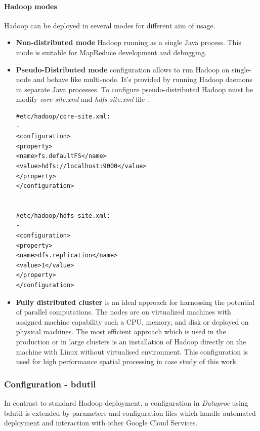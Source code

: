 \documentclass[a4paper,12pt,oneside]{report}
\begin{document}
	
	\paragraph{Hadoop modes} Hadoop can be deployed in several modes for different aim of usage. 
		\begin{itemize}
	    \item \textbf{Non-distributed mode} Hadoop running  as a single Java process. This mode  is suitable for MapReduce development and debugging.
	 	
		\item \textbf{Pseudo-Distributed mode}  configuration allows to run  Hadoop on
		single-node and behave
		like multi-node. It's provided by running Hadoop daemons in separate Java
		processes. To configure pseudo-distributed Hadoop must be modify
		\textit{core-site.xml} and \textit{hdfs-site.xml} file \cite{hadoop_definitive}.  
		
		
		\begin{footnotesize}
			\begin{lstlisting}[style=python]
#etc/hadoop/core-site.xml:
-
<configuration>
<property>
<name>fs.defaultFS</name>
<value>hdfs://localhost:9000</value>
</property>
</configuration>


#etc/hadoop/hdfs-site.xml: 
-
<configuration>
<property>
<name>dfs.replication</name>
<value>1</value>
</property>
</configuration>
			\end{lstlisting}
		\end{footnotesize}
		
		\item \textbf{Fully distributed cluster} is an ideal approach for harnessing the
		potential of	parallel computations. The nodes are on virtualized machines with 
		assigned machine capability such a CPU, memory, and disk or deployed on physical machines. 
		The most efficient approach which is used in the production or in large clusters is an installation of Hadoop directly on the machine with Linux without virtualised environment. 
		This configuration is used for high performance spatial processing in case study of this work.
		
	\end{itemize}
	
	
	\subsubsection{Configuration - bdutil}
	In contrast to standard Hadoop deployment, a configuration in \textit{Dataproc}
	using bdutil is  extended by parameters and configuration files which handle automated deployment
	and interaction with other Google Cloud Services. 
\end{document}

